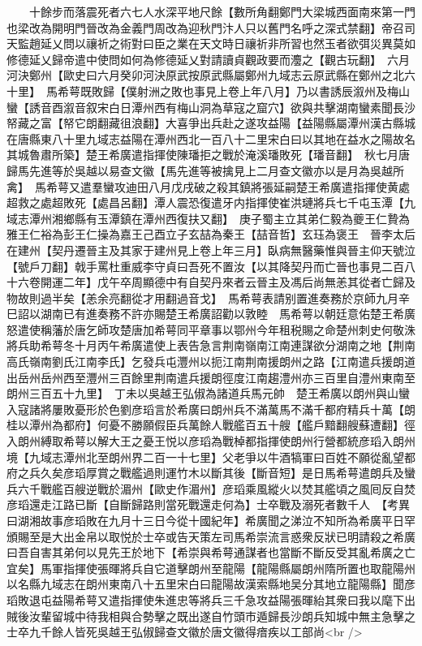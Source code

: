 　　十餘步而落震死者六七人水深平地尺餘【數所角翻鄭門大梁城西面南來第一門也梁改為開明門晉改為金義門周改為迎秋門汴人只以舊門名呼之深式禁翻】帝召司天監趙延乂問以禳祈之術對曰臣之業在天文時日禳祈非所習也然玉者欲弭災異莫如修德延乂歸帝遣中使問如何為修德延乂對請讀貞觀政要而灋之【觀古玩翻】　六月河決鄭州【歐史曰六月癸卯河決原武按原武縣屬鄭州九域志云原武縣在鄭州之北六十里】　馬希萼既敗歸【僕射洲之敗也事見上卷上年八月】乃以書誘辰溆州及梅山蠻【誘音酉溆音叙宋白日潭州西有梅山洞為草寇之窟穴】欲與共擊湖南蠻素聞長沙帑藏之富【帑它朗翻藏徂浪翻】大喜爭出兵赴之遂攻益陽【益陽縣屬潭州漢古縣城在唐縣東八十里九域志益陽在潭州西北一百八十二里宋白曰以其地在益水之陽故名其城魯肅所築】楚王希廣遣指揮使陳璠拒之戰於淹溪璠敗死【璠音翻】　秋七月唐歸馬先進等於吳越以易查文徽【馬先進等被擒見上二月查文徽亦以是月為吳越所禽】　馬希萼又遣羣蠻攻迪田八月戊戌破之殺其鎮將張延嗣楚王希廣遣指揮使黄處超救之處超敗死【處昌呂翻】潭人震恐復遣牙内指揮使崔洪璉將兵七千屯玉潭【九域志潭州湘鄉縣有玉潭鎮在潭州西復扶又翻】　庚子蜀主立其弟仁毅為夔王仁贄為雅王仁裕為彭王仁操為嘉王己酉立子玄喆為秦王【喆音哲】玄珏為褒王　晉李太后在建州【契丹遷晉主及其家于建州見上卷上年三月】臥病無醫藥惟與晉主仰天號泣【號戶刀翻】戟手罵杜重威李守貞曰吾死不置汝【以其降契丹而亡晉也事見二百八十六卷開運二年】戊午卒周顯德中有自契丹來者云晉主及馮后尚無恙其從者亡歸及物故則過半矣【恙余亮翻從才用翻過音戈】　馬希萼表請别置進奏務於京師九月辛巳詔以湖南已有進奏務不許亦賜楚王希廣詔勸以敦睦　馬希萼以朝廷意佑楚王希廣怒遣使稱藩於唐乞師攻楚唐加希萼同平章事以鄂州今年租税賜之命楚州刺史何敬洙將兵助希萼冬十月丙午希廣遣使上表告急言荆南嶺南江南連謀欲分湖南之地【荆南高氏嶺南劉氏江南李氏】乞發兵屯灃州以扼江南荆南援朗州之路【江南遣兵援朗道出岳州岳州西至灃州三百餘里荆南遣兵援朗徑度江南趨澧州亦三百里自澧州東南至朗州三百五十九里】　丁未以吳越王弘俶為諸道兵馬元帥　楚王希廣以朗州與山蠻入寇諸將屢敗憂形於色劉彦瑫言於希廣曰朗州兵不滿萬馬不滿千都府精兵十萬【朗桂以潭州為都府】何憂不勝願假臣兵萬餘人戰艦百五十艘【艦戶黯翻艘蘇遭翻】徑入朗州縛取希萼以解大王之憂王悦以彦瑫為戰棹都指揮使朗州行營都統彦瑫入朗州境【九域志潭州北至朗州界二百一十七里】父老爭以牛酒犒軍曰百姓不願從亂望都府之兵久矣彦瑫厚賞之戰艦過則運竹木以斷其後【斷音短】是日馬希萼遣朗兵及蠻兵六千戰艦百艘逆戰於湄州【歐史作湄州】彦瑫乘風縱火以焚其艦頃之風囘反自焚彦瑫還走江路已斷【自斷歸路則當死戰還走何為】士卒戰及溺死者數千人　【考異曰湖湘故事彦瑫敗在九月十三日今從十國紀年】希廣聞之涕泣不知所為希廣平日罕頒賜至是大出金帛以取悦於士卒或告天策左司馬希崇流言惑衆反狀已明請殺之希廣曰吾自害其弟何以見先王於地下【希崇與希萼通謀者也當斷不斷反受其亂希廣之亡宜矣】馬軍指揮使張暉將兵自它道擊朗州至龍陽【龍陽縣屬朗州隋所置也取龍陽州以名縣九域志在朗州東南八十五里宋白曰龍陽故漢索縣地吴分其地立龍陽縣】聞彦瑫敗退屯益陽希萼又遣指揮使朱進忠等將兵三千急攻益陽張暉紿其衆曰我以麾下出賊後汝輩留城中待我相與合勢擊之既出遂自竹頭市遁歸長沙朗兵知城中無主急擊之士卒九千餘人皆死吳越王弘俶歸查文徽於唐文徽得瘖疾以工部尚<br />
